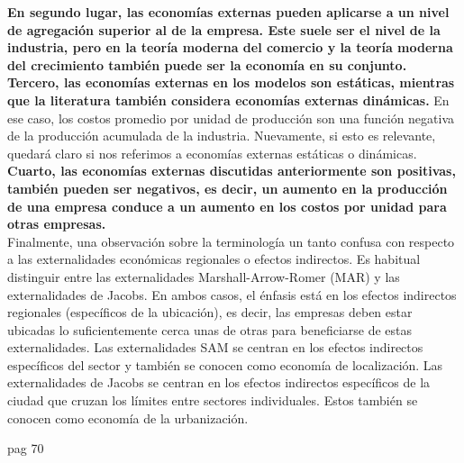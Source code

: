 \textbf{En segundo lugar, las economías externas pueden aplicarse a un nivel de agregación superior al de la empresa. Este suele ser el nivel de la industria, pero en la teoría moderna del comercio y la teoría moderna del crecimiento también puede ser la economía en su conjunto. Tercero, las economías externas en los modelos son estáticas, mientras que la literatura también considera economías externas dinámicas.} En ese caso, los costos promedio por unidad de producción son una función negativa de la producción acumulada de la industria. Nuevamente, si esto es relevante, quedará claro si nos referimos a economías externas estáticas o dinámicas. \textbf{Cuarto, las economías externas discutidas anteriormente son positivas,  también pueden ser negativos, es decir, un aumento en la producción de una empresa conduce a un aumento en los costos por unidad para otras empresas.}\\
Finalmente, una observación sobre la terminología un tanto confusa con respecto a las externalidades económicas regionales o efectos indirectos. Es habitual distinguir entre las externalidades Marshall-Arrow-Romer (MAR) y las externalidades de Jacobs. En ambos casos, el énfasis está en los efectos indirectos regionales (específicos de la ubicación), es decir, las empresas deben estar ubicadas lo suficientemente cerca unas de otras para beneficiarse de estas externalidades. Las externalidades SAM se centran en los efectos indirectos específicos del sector y también se conocen como economía de localización. Las externalidades de Jacobs se centran en los efectos indirectos específicos de la ciudad que cruzan los límites entre sectores individuales. Estos también se conocen como economía de la urbanización. 







pag 70

